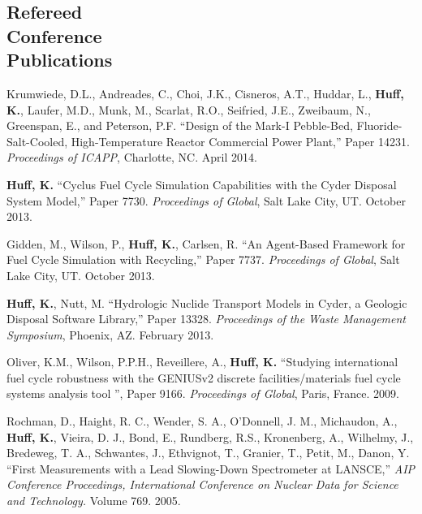\documentclass[margin,line]{resume}
\begin{document}
\begin{resume}
    \section{\mysidestyle Refereed\\Conference\\Publications}
    \begin{bibenum} 
      \item Krumwiede, D.L., Andreades, C., Choi, J.K., Cisneros, A.T., Huddar, L.,
         \textbf{Huff, K.}, Laufer, M.D., Munk, M., Scarlat, R.O., Seifried, J.E.,
         Zweibaum, N., Greenspan, E., and Peterson, P.F.  ``Design of the Mark-I
         Pebble-Bed, Fluoride-Salt-Cooled, High-Temperature Reactor Commercial Power
         Plant,'' Paper 14231.  \emph{Proceedings of ICAPP}, Charlotte, NC. April 2014.  
      \item \textbf{Huff, K.} ``Cyclus Fuel Cycle Simulation Capabilities with the Cyder Disposal System Model,'' Paper 7730.
         \emph{Proceedings of Global}, Salt Lake City, UT. October 2013. 
      \item Gidden, M., Wilson, P., \textbf{Huff, K.}, Carlsen, R. ``An Agent-Based Framework for Fuel Cycle Simulation with Recycling,'' Paper 7737.
         \emph{Proceedings of Global}, Salt Lake City, UT. October 2013. 
      \item \textbf{Huff, K.}, Nutt, M. ``Hydrologic Nuclide Transport Models in Cyder, a Geologic Disposal Software Library,'' Paper 13328.
         \emph{Proceedings of the Waste Management Symposium}, Phoenix, AZ.  February 2013. 
      \item Oliver, K.M., Wilson, P.P.H., Reveillere, A., \textbf{Huff, K.} ``Studying international fuel cycle robustness with the GENIUSv2 discrete 
          facilities/materials fuel cycle systems analysis tool	'', Paper 9166. 
          \emph{Proceedings of Global}, Paris, France. 2009.
      \item Rochman, D., Haight, R. C., Wender, S. A., O'Donnell, J. M., 
        Michaudon, A., \textbf{Huff, K.}, Vieira, D. J., Bond, E., Rundberg, R.S., 
        Kronenberg, A., Wilhelmy, J., Bredeweg, T. A., Schwantes, J., Ethvignot, T., 
        Granier, T., Petit, M., Danon, Y. 
        ``First Measurements with a Lead Slowing-Down Spectrometer at LANSCE,'' 
        \emph{AIP Conference Proceedings, International Conference on Nuclear 
        Data for Science and Technology.} Volume 769. 2005.
    \end{bibenum}

\end{resume}
\end{document}
